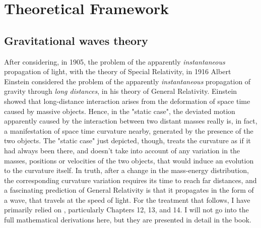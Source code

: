 \chapter{Theoretical Framework}


\section{Gravitational waves theory}
After considering, in 1905, the problem of the apparently \textit{instantaneous} propagation of light, with the theory of Special Relativity, in 1916 Albert Einstein considered the problem of the apparently \textit{instantaneous} propagation of gravity through \textit{long distances}, in his theory of General Relativity.
Einstein showed that long-distance interaction arises from the deformation of space time caused by massive objects.
Hence, in the "static case", the deviated motion apparently caused by the interaction between two distant masses really is, in fact, a manifestation of space time curvature nearby, generated by the presence of the two objects.
The "static case" just depicted, though, treats the curvature as if it had always been there, and doesn't take into account of any variation in the masses, positions or velocities of the two objects, that would induce an evolution to the curvature itself.
In truth, after a change in the mass-energy distribution, the corresponding curvature variation requires its time to reach far distances, and a fascinating prediction of General Relativity is that it propagates in the form of a wave, that travels at the speed of light.
For the treatment that follows, I have primarily relied on \cite{ferrari2020general}, particularly Chapters 12, 13, and 14.
I will not go into the full mathematical derivations here, but they are presented in detail in the book.

